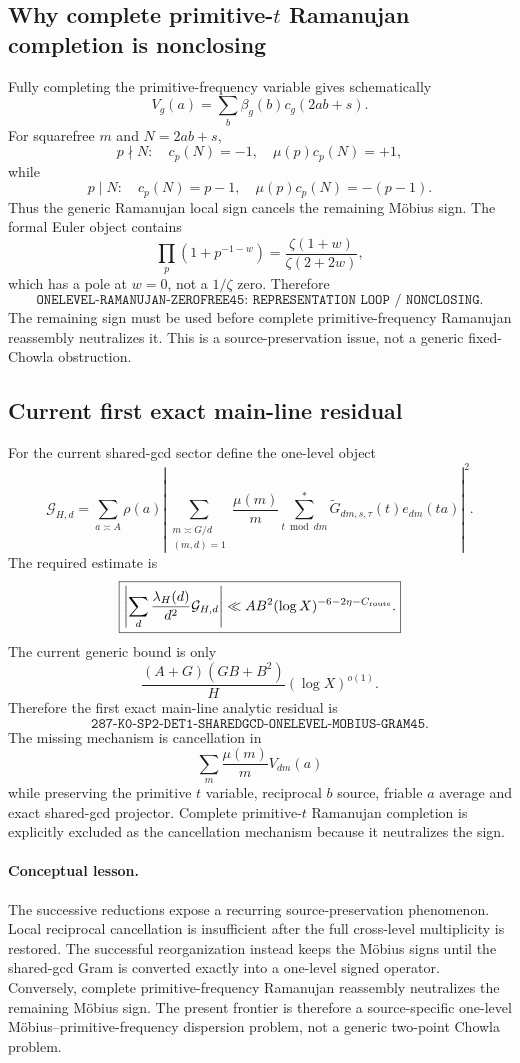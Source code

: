 \documentclass[11pt]{article}
\theoremstyle{definition}
\newcommand{\1}{\mathbf 1}
\begin{document}
\subsection{Why complete primitive-$t$ Ramanujan completion is nonclosing}

Fully completing the primitive-frequency variable gives schematically
\[
V_g(a)=\sum_b\beta_g(b)c_g(2ab+s).
\]
For squarefree $m$ and $N=2ab+s$,
\[
p\nmid N:\quad c_p(N)=-1,\quad \mu(p)c_p(N)=+1,
\]
while
\[
p\mid N:\quad c_p(N)=p-1,\quad \mu(p)c_p(N)=-(p-1).
\]
Thus the generic Ramanujan local sign cancels the remaining M\"obius sign.  The formal
Euler object contains
\[
\prod_p(1+p^{-1-w})
=
\frac{\zeta(1+w)}{\zeta(2+2w)},
\]
which has a pole at $w=0$, not a $1/\zeta$ zero.  Therefore
\[
\boxed{\texttt{ONELEVEL-RAMANUJAN-ZEROFREE45:
REPRESENTATION LOOP / NONCLOSING}}.
\]
The remaining sign must be used before complete primitive-frequency Ramanujan reassembly
neutralizes it.  This is a source-preservation issue, not a generic fixed-Chowla
obstruction.

\subsection{Current first exact main-line residual}

For the current shared-gcd sector define the one-level object
\[
\boxed{
\mathcal G_{H,d}
=
\sum_{a\asymp A}\rho(a)
\left|
\sum_{\substack{m\asymp G/d\\(m,d)=1}}
\frac{\mu(m)}m
\sum_{t\bmod dm}^{*}
\widetilde G_{dm,s,\tau}(t)e_{dm}(ta)
\right|^2.
}
\]
The required estimate is
\[
\boxed{
\left|
\sum_d\frac{\lambda_H(d)}{d^2}\mathcal G_{H,d}
\right|
\ll
AB^2(\log X)^{-6-2\eta-C_{\rm route}}.
}
\]
The current generic bound is only
\[
\frac{(A+G)(GB+B^2)}H(\log X)^{o(1)}.
\]
Therefore the first exact main-line analytic residual is
\[
\boxed{
\texttt{287-K0-SP2-DET1-SHAREDGCD-ONELEVEL-MOBIUS-GRAM45}.
}
\]
The missing mechanism is cancellation in
\[
\sum_m\frac{\mu(m)}mV_{dm}(a)
\]
while preserving the primitive $t$ variable, reciprocal $b$ source, friable $a$ average
and exact shared-gcd projector.  Complete primitive-$t$ Ramanujan completion is explicitly
excluded as the cancellation mechanism because it neutralizes the sign.

\paragraph{Conceptual lesson.}
The successive reductions expose a recurring source-preservation phenomenon.  Local
reciprocal cancellation is insufficient after the full cross-level multiplicity is
restored.  The successful reorganization instead keeps the M\"obius signs until the
shared-gcd Gram is converted exactly into a one-level signed operator.  Conversely,
complete primitive-frequency Ramanujan reassembly neutralizes the remaining M\"obius sign.
The present frontier is therefore a source-specific one-level M\"obius--primitive-frequency
dispersion problem, not a generic two-point Chowla problem.
\end{document}
